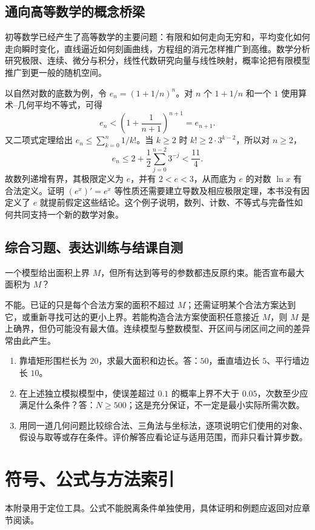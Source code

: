 \documentclass[UTF8]{ctexbook}
\begin{document}
\section{通向高等数学的概念桥梁}
初等数学已经产生了高等数学的主要问题：有限和如何走向无穷和，平均变化如何走向瞬时变化，直线逼近如何刻画曲线，方程组的消元怎样推广到高维。数学分析研究极限、连续、微分与积分，线性代数研究向量与线性映射，概率论把有限模型推广到更一般的随机空间。

以自然对数的底数为例，令 $e_n=(1+1/n)^n$。对 $n$ 个 $1+1/n$ 和一个 $1$ 使用算术--几何平均不等式，可得
\[
 e_n<\left(1+\frac1{n+1}\right)^{n+1}=e_{n+1}.
\]
又二项式定理给出 $e_n\le\sum_{k=0}^n1/k!$。当 $k\ge2$ 时 $k!\ge2\cdot3^{k-2}$，所以对 $n\ge2$，
\[
 e_n\le2+\frac12\sum_{j=0}^{n-2}3^{-j}<\frac{11}4.
\]
故数列递增有界，其极限定义为 $e$，并有 $2<e<3$，从而底为 $e$ 的对数 $\ln x$ 有合法定义。证明 $(e^x)'=e^x$ 等性质还需要建立导数及相应极限定理，本书没有因定义了 $e$ 就提前假定这些结论。这个例子说明，数列、计数、不等式与完备性如何共同支持一个新的数学对象。

\section{综合习题、表达训练与结课自测}
\begin{example}
一个模型给出面积上界 $M$，但所有达到等号的参数都违反原约束。能否宣布最大面积为 $M$？
\end{example}
\begin{solve}
不能。已证的只是每个合法方案的面积不超过 $M$；还需证明某个合法方案达到它，或重新寻找可达的更小上界。若能构造合法方案使面积任意接近 $M$，则 $M$ 是上确界，但仍可能没有最大值。连续模型与整数模型、开区间与闭区间之间的差异常由此产生。
\end{solve}
\begin{enumerate}
\item 靠墙矩形围栏长为 $20$，求最大面积和边长。答：$50$，垂直墙边长 $5$、平行墙边长 $10$。
\item 在上述独立模拟模型中，使误差超过 $0.1$ 的概率上界不大于 $0.05$，次数至少应满足什么条件？答：$N\ge500$；这是充分保证，不一定是最小实际所需次数。
\item 用同一道几何问题比较综合法、三角法与坐标法，逐项说明它们使用的对象、假设与取等或存在条件。评价解答应看论证与适用范围，而非只看计算步数。
\end{enumerate}

\appendix

\chapter{符号、公式与方法索引}
\label{app:em-notation}
本附录用于定位工具。公式不能脱离条件单独使用，具体证明和例题应返回对应章节阅读。
\end{document}
